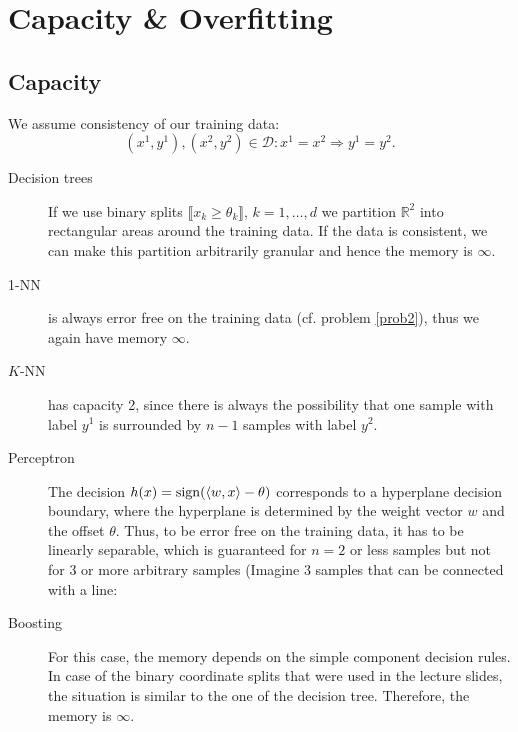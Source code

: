 \documentclass{scrartcl}
\begin{document}
\section{Capacity \& Overfitting}
\subsection{Capacity}
We assume consistency of our training data: 
\begin{equation}
	(x^1,y^1),(x^2,y^2)\in \mathcal D: x^1=x^2 \Rightarrow y^1 =y^2.
\end{equation}
\begin{description}
	\item[Decision trees] If we use binary splits $\llbracket x_k \geq \theta_k\rrbracket$, $k=1,\dots,d$ we partition $\mathbb R^2$ into rectangular areas around the training data. If the data is consistent, we can make this partition arbitrarily granular and hence the memory is $\infty$.
	\item[1-NN] is always error free on the training data (cf. problem \ref{prob2}), thus we again have memory $\infty$.
	\item[$K$-NN] has capacity 2, since there is always the possibility that one sample with label $y^1$ is surrounded by $n-1$ samples with label $y^2$.
	\item[Perceptron] The decision $h(x) = \sign(\inprod{w}{x} -\theta)$ corresponds to a hyperplane decision boundary, where the hyperplane is determined by the weight vector $w$ and the offset $\theta$. Thus, to be error free on the training data, it has to be linearly separable, which is guaranteed for $n=2$ or less samples but not for 3 or more arbitrary samples (Imagine 3 samples that can be connected with a line:
	\begin{center}
	\end{center}
	\item[Boosting] For this case, the memory depends on the simple component decision rules. In case of the binary coordinate splits that were used in the lecture slides, the situation is similar to the one of the decision tree. Therefore, the memory is $\infty$.
\end{description}
	
\end{document}
